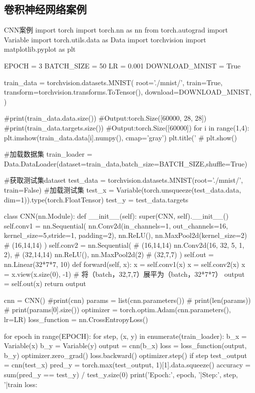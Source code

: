 \documentclass[openbib]{article}
\begin{document}
\subsection{卷积神经网络案例}
\begin{Python}{CNN案例}
import torch
import torch.nn as nn
from torch.autograd import Variable
import torch.utils.data as Data
import torchvision
import matplotlib.pyplot as plt

EPOCH = 3
BATCH_SIZE = 50
LR = 0.001
DOWNLOAD_MNIST = True

train_data = torchvision.datasets.MNIST(
root='./mnist/',
train=True,
transform=torchvision.transforms.ToTensor(),
download=DOWNLOAD_MNIST,
)

#print(train_data.data.size())       #Output:torch.Size([60000, 28, 28])
#print(train_data.targets.size())    #Output:torch.Size([60000])
for i in range(1,4):
	plt.imshow(train_data.data[i].numpy(), cmap='gray')
	plt.title('%
#     plt.show()

#加载数据集
train_loader = Data.DataLoader(dataset=train_data,batch_size=BATCH_SIZE,shuffle=True)


#获取测试集dataset
test_data = torchvision.datasets.MNIST(root='./mnist/', train=False)
#加载测试集
test_x = Variable(torch.unsqueeze(test_data.data, dim=1)).type(torch.FloatTensor)
test_y = test_data.targets

class CNN(nn.Module):
def __init__(self):
	super(CNN, self).__init__()
	self.conv1 = nn.Sequential(
	nn.Conv2d(in_channels=1, out_channels=16, kernel_size=5,stride=1, padding=2),
	nn.ReLU(),
	nn.MaxPool2d(kernel_size=2) # (16,14,14)
	)
	self.conv2 = nn.Sequential( # (16,14,14)
	nn.Conv2d(16, 32, 5, 1, 2), # (32,14,14)
	nn.ReLU(),
	nn.MaxPool2d(2) # (32,7,7)
	)
	self.out = nn.Linear(32*7*7, 10)
def forward(self, x):
	x = self.conv1(x)
	x = self.conv2(x)
	x = x.view(x.size(0), -1) # 将（batch，32,7,7）展平为（batch，32*7*7）
	output = self.out(x)
	return output
	
cnn = CNN()
#print(cnn)
params = list(cnn.parameters())
# print(len(params))
# print(params[0].size())
optimizer = torch.optim.Adam(cnn.parameters(), lr=LR)
loss_function = nn.CrossEntropyLoss()

for epoch in range(EPOCH):
	for step, (x, y) in enumerate(train_loader):
		b_x = Variable(x)
		b_y = Variable(y)
		output = cnn(b_x)
		loss = loss_function(output, b_y)
		optimizer.zero_grad()
		loss.backward()
		optimizer.step()
		if step %
			test_output = cnn(test_x)
			pred_y = torch.max(test_output, 1)[1].data.squeeze()
			accuracy = sum(pred_y == test_y) / test_y.size(0)
			print('Epoch:', epoch, '|Step:', step,
				  '|train loss:%


\end{Python}
\end{document}
